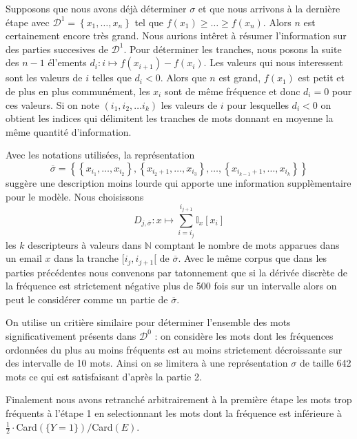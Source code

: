 \documentclass[a4paper, french]{article}
\begin{document}
Supposons que nous avons d\'ej\`a d\'eterminer $\sigma$ et que nous arrivons
\`a la derni\`ere \'etape avec $\mathcal{D}^1=\left\{x_1,\ldots,x_n\right\}$
tel que $f(x_1)\geq\ldots\geq f(x_n)$. Alors $n$ est certainement encore tr\`es
grand. Nous aurions int\^eret \`a r\'esumer l'information sur des parties
succesives de $\mathcal{D}^1$. Pour d\'eterminer les tranches, nous posons la
suite des $n-1$ \'el'ements $d_i\colon i\mapsto f(x_{i+1})-f(x_i)$.
Les valeurs qui nous interessent sont les valeurs de $i$ telles que $d_i<0$.
Alors que $n$ est grand, $f(x_1)$ est petit et de plus en plus commun\'ement,
les $x_i$ sont de m\^eme fr\'equence et donc $d_i=0$ pour ces valeurs.
Si on note $(i_1, i_2, \ldots i_k)$ les valeurs de $i$ pour lesquelles $d_i<0$
on obtient les indices qui d\'elimitent les tranches de mots
donnant en moyenne la m\^eme quantit\'e d'information.

Avec les notations utilis\'ees, la repr\'esentation
\begin{equation}
    \overline\sigma=\left\{
        \left\{
            x_{i_1},\ldots,x_{i_2}
        \right\},
        \left\{
            x_{i_2+1},\ldots,x_{i_3}
        \right\},
        \ldots,
        \left\{
            x_{i_{k-1}+1},\ldots,x_{i_k}
        \right\}
    \right\}
\end{equation}
sugg\`ere une description moins lourde qui apporte une information
suppl\`ementaire pour le mod\`ele. Nous choisissons
\begin{equation}
    D_{j,\overline\sigma}\colon
    x\mapsto
    \sum_{i=i_j}^{i_{j+1}} \mathbb{I}_{x}[x_{i}]
\end{equation}
les $k$ descripteurs \`a valeurs dans $\mathbb{N}$ comptant le nombre de
mots apparues dans un email $x$ dans la tranche $[i_j,i_{j+1}[$ de
$\overline\sigma$. Avec le m\^eme corpus que dans les parties pr\'ec\'edentes
nous convenons par tatonnement que si la d\'eriv\'ee discr\`ete de
la fr\'equence est strictement n\'egative plus de 500 fois sur un intervalle
alors on peut le consid\'erer comme un partie de $\overline\sigma$.

On utilise un criti\`ere similaire pour d\'eterminer l'ensemble des mots
significativement pr\'esents dans $\mathcal{D}^0$ : on consid\`ere les
mots dont les fr\'equences ordonn\'ees du plus au moins fr\'equents est
au moins strictement d\'ecroissante sur des intervalle de 10 mots. Ainsi
on se limitera \`a une repr\'esentation $\sigma$ de taille 642 mots ce qui
est satisfaisant d'apr\`es la partie 2.

Finalement nous avons retranch\'e arbitrairement \`a la premi\`ere \'etape les
mots trop fr\'equents \`a l'\'etape 1 en selectionnant les mots dont la
fr\'equence est inf\'erieure \`a $\frac{1}{2}\cdot$Card$(\{Y=1\})/$Card$(E)$.
\end{document}
